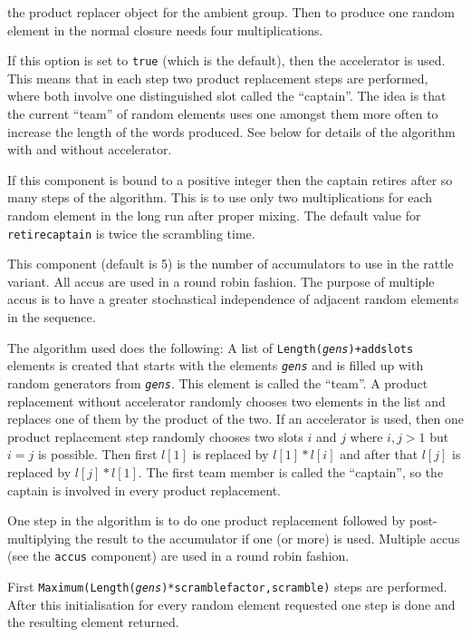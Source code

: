\documentclass[a4paper,11pt]{report}
\begin{document}
{{{\begin{description}
the product replacer object for the ambient group. Then to produce one random
element in the normal closure needs four multiplications. 
\item[{\texttt{accelerator}}] If this option is set to \texttt{true} (which is the default), then the accelerator is used. This means that in each
step two product replacement steps are performed, where both involve one
distinguished slot called the ``captain''. The idea is that the current ``team'' of random elements uses one amongst them more often to increase the length of
the words produced. See below for details of the algorithm with and without
accelerator. 
\item[{\texttt{retirecaptain}}] If this component is bound to a positive integer then the captain retires
after so many steps of the algorithm. This is to use only two multiplications
for each random element in the long run after proper mixing. The default value
for \texttt{retirecaptain} is twice the scrambling time. 
\item[{\texttt{accus}}] This component (default is 5) is the number of accumulators to use in the
rattle variant. All accus are used in a round robin fashion. The purpose of
multiple accus is to have a greater stochastical independence of adjacent
random elements in the sequence. 
\end{description}
 The algorithm used does the following: A list of \texttt{Length(}\mbox{\texttt{\mdseries\slshape gens}}\texttt{)+addslots} elements is created that starts with the elements \mbox{\texttt{\mdseries\slshape gens}} and is filled up with random generators from \mbox{\texttt{\mdseries\slshape gens}}. This element is called the ``team''. A product replacement without accelerator randomly chooses two elements in
the list and replaces one of them by the product of the two. If an accelerator
is used, then one product replacement step randomly chooses two slots $i$ and $j$ where $i,j > 1$ but $i=j$ is possible. Then first $l[1]$ is replaced by $l[1]*l[i]$ and after that $l[j]$ is replaced by $l[j]*l[1]$. The first team member is called the ``captain'', so the captain is involved in every product replacement. 

 One step in the algorithm is to do one product replacement followed by
post-multiplying the result to the accumulator if one (or more) is used.
Multiple accus (see the \texttt{accus} component) are used in a round robin fashion. 

 First \texttt{Maximum(Length(}\mbox{\texttt{\mdseries\slshape gens}}\texttt{)*scramblefactor,scramble)} steps are performed. After this initialisation for every random element
requested one step is done and the resulting element returned. }

}}
\end{document}
